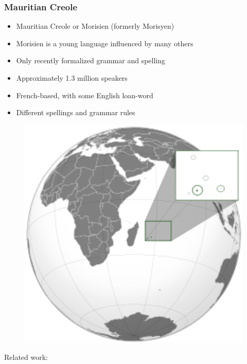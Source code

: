 \documentclass[aspectratio=169]{beamer}
\begin{document}
\begin{frame}[fragile]
	\frametitle{Mauritian Creole}
    \begin{minipage}{.70\textwidth}
    \centering
    \begin{itemize}
        \item Mauritian Creole or Morisien (formerly Morisyen)
        \item Morisien is a young language influenced by many others
        \item Only recently formalized grammar and spelling
        \item Approximately 1.3 million speakers
        \item French-based, with some English loan-word
        \item Different spellings and grammar rules
    \end{itemize}
    \end{minipage}%
    \begin{minipage}{.30\textwidth}
      \begin{figure}
        \centering
        \includegraphics[width=1.0\textwidth]{images/Mauritius-Wikipedia-Position.png} 
    \end{figure}
    \end{minipage}

    \vspace{0.7cm}
    \begin{minipage}{1.0\textwidth}
    \centering
    \footnotesize
    Related work: \citep{rajah-carrim2009UseStandardisationMauritian, gobin-rahimbux2023KreolStemHybridLanguagedependent, ramsurrun2024ParsingMauritianCreole, bastien2022CaseStudyData, goodasahib-kaudeer2019AutomaticSpeechRecognition, gobin-rahimbux2023VoiceBasedPersonalAssistant, sukhoo2014TranslationEnglishMauritian, dabre2014AnouTradirExperiences, dabre2022MorisienMTDatasetMauritian}
    \end{minipage}
\end{frame}
\end{document}
